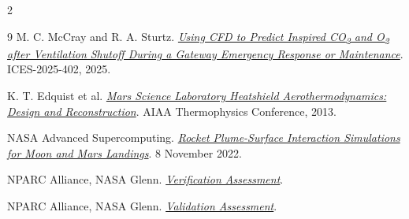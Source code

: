 \documentclass[10pt,a4paper]{article}
\begin{document}
\begin{multicols}{2}
\begin{thebibliography}{9}
M. C. McCray and R. A. Sturtz.
\href{https://ntrs.nasa.gov/citations/20250003881}
{\emph{Using CFD to Predict Inspired CO\textsubscript{2} and O\textsubscript{2}
after Ventilation Shutoff During a Gateway Emergency Response or Maintenance}}.
ICES-2025-402, 2025.

K. T. Edquist et al.
\href{https://ntrs.nasa.gov/citations/20140000343}
{\emph{Mars Science Laboratory Heatshield Aerothermodynamics:
Design and Reconstruction}}.
AIAA Thermophysics Conference, 2013.

NASA Advanced Supercomputing.
\href{https://www.nas.nasa.gov/SC22/research/project12.html}
{\emph{Rocket Plume-Surface Interaction Simulations for Moon and Mars Landings}}.
8 November 2022.

NPARC Alliance, NASA Glenn.
\href{https://www.grc.nasa.gov/www/wind/valid/tutorial/verassess.html}
{\emph{Verification Assessment}}.

NPARC Alliance, NASA Glenn.
\href{https://www.grc.nasa.gov/www/wind/valid/tutorial/valassess.html}
{\emph{Validation Assessment}}.

\end{thebibliography}

\endgroup

\end{multicols}
\end{document}
